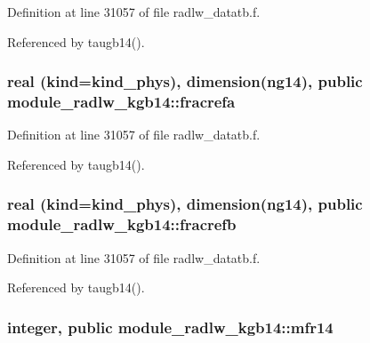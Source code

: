 Definition at line 31057 of file radlw\+\_\+datatb.\+f.



Referenced by taugb14().

\subsubsection[{\texorpdfstring{fracrefa}{fracrefa}}]{\setlength{\rightskip}{0pt plus 5cm}real (kind=kind\+\_\+phys), dimension(ng14), public module\+\_\+radlw\+\_\+kgb14\+::fracrefa}\hypertarget{namespacemodule__radlw__kgb14_ae1e7065b9ea30b36a3665ad594545e9b}{}\label{namespacemodule__radlw__kgb14_ae1e7065b9ea30b36a3665ad594545e9b}


Definition at line 31057 of file radlw\+\_\+datatb.\+f.



Referenced by taugb14().

\subsubsection[{\texorpdfstring{fracrefb}{fracrefb}}]{\setlength{\rightskip}{0pt plus 5cm}real (kind=kind\+\_\+phys), dimension(ng14), public module\+\_\+radlw\+\_\+kgb14\+::fracrefb}\hypertarget{namespacemodule__radlw__kgb14_a13a211bf8a903d0720fa72ac90e4fc3f}{}\label{namespacemodule__radlw__kgb14_a13a211bf8a903d0720fa72ac90e4fc3f}


Definition at line 31057 of file radlw\+\_\+datatb.\+f.



Referenced by taugb14().

\subsubsection[{\texorpdfstring{mfr14}{mfr14}}]{\setlength{\rightskip}{0pt plus 5cm}integer, public module\+\_\+radlw\+\_\+kgb14\+::mfr14}\hypertarget{namespacemodule__radlw__kgb14_a52354badbce95c005b19bd5a443fd488}{}\label{namespacemodule__radlw__kgb14_a52354badbce95c005b19bd5a443fd488}


